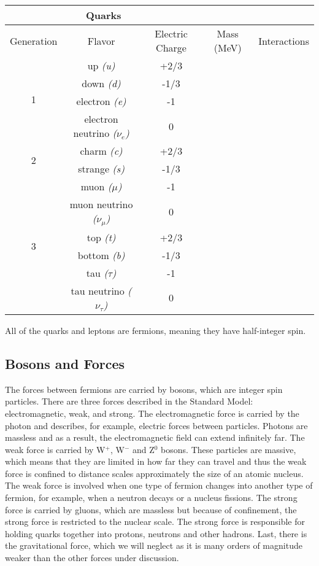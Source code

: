 \documentclass[11pt]{article}
\begin{document}
\begin{table}
	\begin{tabular}{| c || c | c | c | c |}
		\multicolumn{3}{c}{Quarks} \\
		\hline
		Generation &  Flavor & Electric Charge & Mass (MeV) & Interactions\\
		\hline
		\multirow{4}{*}{1} & up \it{(u)} & +2/3 \\
		    & down \it{(d)} & -1/3  \\
		    & electron \it{(e)}& -1 \\
		    & electron neutrino \it{($\nu_{e}$)} & 0 \\
		\hline
		\multirow{2}{*}{2} & charm \it{(c)} & +2/3 \\
		    & strange \it{(s)} & -1/3 \\
		    & muon \it{($\mu$)} & -1 \\
		    & muon neutrino \it{($\nu_{\mu}$)} & 0 \\
		\hline 
		\multirow{2}{*}{3} & top \it{(t)} & +2/3 \\
		    & bottom \it{(b)} & -1/3  \\ 
		    & tau \it{($\tau$)} & -1 \\
		    & tau neutrino \it{($\nu_{\tau}$)} & 0 \\		    
		\hline
	\end{tabular}
	\label{tab:QLTable}
\end{table}

All of the quarks and leptons are fermions, meaning they have half-integer spin.

\subsection{Bosons and Forces}

The forces between fermions are carried by bosons, which are integer spin particles.  There are three forces described in the Standard Model: electromagnetic, weak, and strong.  The electromagnetic force is carried by the photon and describes, for example, electric forces between particles.  Photons are massless and as a result, the electromagnetic field can extend infinitely far.  The weak force is carried by W$^+$, W$^-$ and Z$^0$ bosons.  These particles are massive, which means that they are limited in how far they can travel and thus the weak force is confined to distance scales approximately the size of an atomic nucleus.  The weak force is involved when one type of fermion changes into another type of fermion, for example, when a neutron decays or a nucleus fissions.  The strong force is carried by gluons, which are massless but because of confinement, the strong force is restricted to the nuclear scale.  The strong force is responsible for holding quarks together into protons, neutrons and other hadrons. Last, there is the gravitational force, which we will neglect as it is many orders of magnitude weaker than the other forces under discussion.
\end{document}
